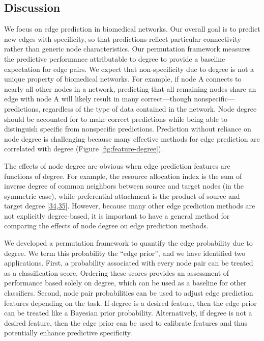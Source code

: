 \hypertarget{discussion}{%
\subsection{Discussion}\label{discussion}}

We focus on edge prediction in biomedical networks.
Our overall goal is to predict new edges with specificity, so that predictions reflect particular connectivity rather than generic node characteristics.
Our permutation framework measures the predictive performance attributable to degree to provide a baseline expectation for edge pairs.
We expect that non-specificity due to degree is not a unique property of biomedical networks.
For example, if node A connects to nearly all other nodes in a network, predicting that all remaining nodes share an edge with node A will likely result in many correct---though nonspecific---predictions, regardless of the type of data contained in the network.
Node degree should be accounted for to make correct predictions while being able to distinguish specific from nonspecific predictions.
Prediction without reliance on node degree is challenging because many effective methods for edge prediction are correlated with degree (Figure \ref{fig:feature-degree}).

The effects of node degree are obvious when edge prediction features are functions of degree.
For example, the resource allocation index is the sum of inverse degree of common neighbors between source and target nodes (in the symmetric case), while preferential attachment is the product of source and target degree {[}\protect\hyperlink{ref-1F96bsjSm}{34},\protect\hyperlink{ref-suzIn5oo}{35}{]}.
However, because many other edge prediction methods are not explicitly degree-based, it is important to have a general method for comparing the effects of node degree on edge prediction methods.

We developed a permutation framework to quantify the edge probability due to degree.
We term this probability the ``edge prior'', and we have identified two applications.
First, a probability associated with every node pair can be treated as a classification score.
Ordering these scores provides an assessment of performance based solely on degree, which can be used as a baseline for other classifiers.
Second, node pair probabilities can be used to adjust edge prediction features depending on the task.
If degree is a desired feature, then the edge prior can be treated like a Bayesian prior probability.
Alternatively, if degree is not a desired feature, then the edge prior can be used to calibrate features and thus potentially enhance predictive specificity.

